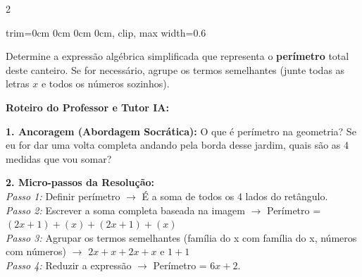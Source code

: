 \begin{multicols*}{2}
\begin{enunciadoLiteral}
\begin{center}
\begin{adjustbox}{trim=0cm 0cm 0cm 0cm, clip, max width=0.6\linewidth}
\end{adjustbox}
\end{center}

Determine a expressão algébrica simplificada que representa o \textbf{perímetro} total deste canteiro. Se for necessário, agrupe os termos semelhantes (junte todas as letras $x$ e todos os números sozinhos).
\end{enunciadoLiteral}

\ifgabarito
    \begin{tcolorbox}[colback=CorTitUm!5, colframe=CorTitUm, boxrule=1pt, arc=4pt, left=6pt, right=6pt, top=6pt, bottom=6pt]
    \small\textbf{\textcolor{CorTitUm}{Roteiro do Professor e Tutor IA:}}\par\vspace{0.1cm}
    \color{CinzaEscuro}
    \textbf{1. Ancoragem (Abordagem Socrática):} O que é perímetro na geometria? Se eu for dar uma volta completa andando pela borda desse jardim, quais são as 4 medidas que vou somar?\par\vspace{0.1cm}
    
    \textbf{2. Micro-passos da Resolução:}\\
    \textit{Passo 1:} Definir perímetro $\rightarrow$ É a soma de todos os 4 lados do retângulo.\\
    \textit{Passo 2:} Escrever a soma completa baseada na imagem $\rightarrow$ Perímetro = $ (2x + 1) + (x) + (2x + 1) + (x) $\\
    \textit{Passo 3:} Agrupar os termos semelhantes (família do x com família do x, números com números) $\rightarrow$ $ 2x + x + 2x + x $ e $ 1 + 1 $\\
    \textit{Passo 4:} Reduzir a expressão $\rightarrow$ Perímetro = $ 6x + 2 $.\par\vspace{0.1cm}
    

\end{tcolorbox}
\end{multicols*}
